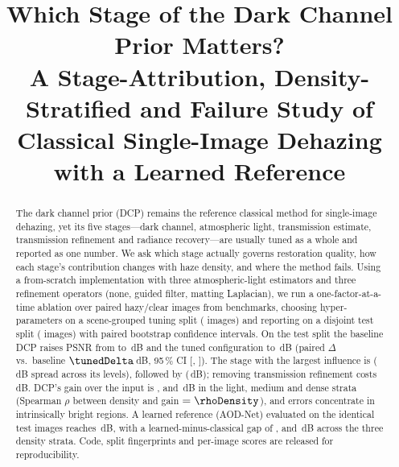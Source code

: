 \documentclass[conference]{IEEEtran}
\begin{document}
\title{Which Stage of the Dark Channel Prior Matters?\\
A Stage-Attribution, Density-Stratified and Failure Study of Classical Single-Image Dehazing with a Learned Reference}

\author{
}
\maketitle

\begin{abstract}
The dark channel prior (DCP) remains the reference classical method for single-image dehazing, yet its five stages---dark
channel, atmospheric light, transmission estimate, transmission refinement and radiance recovery---are usually tuned as a
whole and reported as one number. We ask which stage actually governs restoration quality, how each stage's contribution
changes with haze density, and where the method fails. Using a from-scratch implementation with three atmospheric-light
estimators and three refinement operators (none, guided filter, matting Laplacian), we run a one-factor-at-a-time ablation
over \nImages{} paired hazy/clear images from \nDatasets{} benchmarks, choosing hyper-parameters on a scene-grouped tuning
split (\nTune{} images) and reporting on a disjoint test split (\nTest{} images) with paired bootstrap confidence intervals.
On the test split the baseline DCP raises PSNR from  to \basePSNR{}\,dB and the tuned configuration to
\tunedPSNR{}\,dB (paired $\Delta$ vs.\ baseline $\tunedDelta$\,dB, 95\,\% CI [\tunedDeltaLo, \tunedDeltaHi]). The stage with
the largest influence is \impTop{} (\impTopVal{}\,dB spread across its levels), followed by \impSecond{} (\impSecondVal{}\,dB);
removing transmission refinement costs \,dB. DCP's gain over the input is \gainLight{}, \gainMedium{} and
\gainDense{}\,dB in the light, medium and dense strata (Spearman $\rho$ between density and gain $=\rhoDensity$), and
errors concentrate in intrinsically bright regions. A learned reference (AOD-Net) evaluated on the identical test images
reaches \finAodPSNR{}\,dB, with a learned-minus-classical gap of \gapLight{}, \gapMedium{} and \gapDense{}\,dB across the
three density strata. Code, split fingerprints and per-image scores are released for reproducibility.
\end{abstract}
\end{document}
